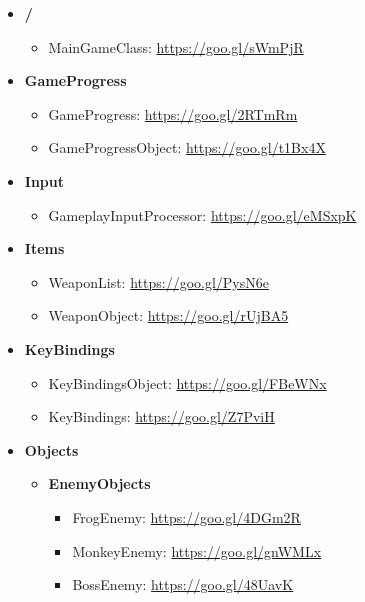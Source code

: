 \documentclass[12p]{article}
\begin{document}
\renewcommand{\labelitemi}{\faFolderOpen}
\renewcommand{\labelitemii}{\faFile}
\renewcommand{\labelitemiii}{\faFile}
\begin{itemize}
  \item \textbf{/}
  \begin{itemize}
    \item MainGameClass: \url{https://goo.gl/sWmPjR}
  \end{itemize}
  
  \item \textbf{GameProgress}
  \begin{itemize}
    \item GameProgress: \url{https://goo.gl/2RTmRm} 
    \item GameProgressObject: \url{https://goo.gl/t1Bx4X}
  \end{itemize}
  
  \item \textbf{Input}
  \begin{itemize}
    \item GameplayInputProcessor: \url{https://goo.gl/eMSxpK}
  \end{itemize}
  
  \item \textbf{Items}
  \begin{itemize}
    \item WeaponList: \url{https://goo.gl/PysN6e}
    \item WeaponObject: \url{https://goo.gl/rUjBA5}
  \end{itemize}
  
  \item \textbf{KeyBindings}
  \begin{itemize}
    \item KeyBindingsObject: \url{https://goo.gl/FBeWNx}
    \item KeyBindings: \url{https://goo.gl/Z7PviH}
  \end{itemize}
  
  \item \textbf{Objects}
  \begin{itemize}
    \item[\faFolderOpen] \textbf{EnemyObjects}
    \begin{itemize}
      \item FrogEnemy: \url{https://goo.gl/4DGm2R}
      \item MonkeyEnemy: \url{https://goo.gl/gnWMLx}
      \item BossEnemy: \url{https://goo.gl/48UavK}
    \end{itemize}
    

\end{itemize}
\end{itemize}
\end{document}
